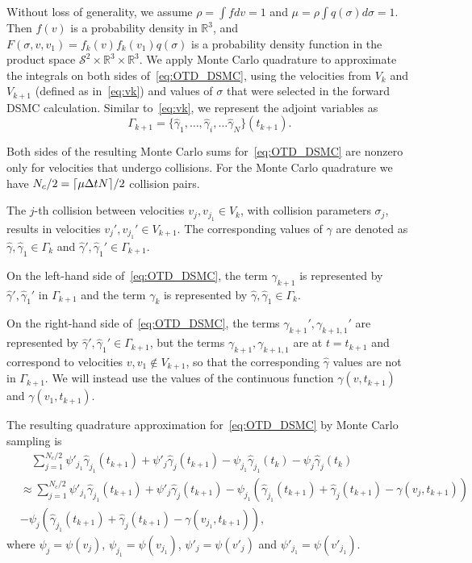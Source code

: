 \documentclass[times,final,nopreprintline]{elsarticle}
\DeclarePairedDelimiter{\ceil}{\lceil}{\rceil}
\newcommand{\bbR}{\mathbb R} \newcommand{\bbS}{\mathbb S}
\newcommand{\cS}{\mathcal S} \newcommand{\cT}{\mathcal T}
\newcommand{\Rthree}{{\bbR^3}}
\newcommand{\Stwo}{{\cS^2}}
\begin{document}
Without loss of generality, we assume $\rho = \int  f dv = 1$ and 
$\mu = \rho \int q(\sigma) d\sigma = 1$. Then $f(v)$ is a probability density in $\Rthree$, and $F(\sigma,v,v_1) =  f_k(v) f_k(v_1)q(\sigma)$ is a probability density function in the product space $\Stwo \times \Rthree \times \Rthree$. We apply Monte Carlo quadrature to approximate the integrals on both sides of~\eqref{eq:OTD_DSMC}, using the  velocities from  $V_{k}$ and $V_{k+1}$ (defined as in~\eqref{eq:vk}) and values of $\sigma$ that were selected in the forward DSMC calculation. Similar to~\eqref{eq:vk}, we represent the adjoint variables as
\begin{equation*} %
\Gamma_{k+1} =\{\hat \gamma_1, \ldots , \hat \gamma_i,\ldots \hat \gamma_N\} (t_{k+1}).
\end{equation*}

Both sides of the resulting Monte Carlo sums for~\eqref{eq:OTD_DSMC} are  nonzero only for velocities that undergo collisions. For the  Monte Carlo quadrature we have  $N_c/2 =  \ceil[]{ \mu\Delta t  N}/2$ collision pairs. 

The $j$-th collision between velocities $v_{j},v_{j_1} \in V_k$, with collision parameters $\sigma_{j}$,   results in velocities $v_{j}',v_{j_1}' \in V_{k+1}$. The corresponding values of $\gamma$ are denoted as $\hat \gamma, \hat \gamma_1 \in \Gamma_k$  and $\hat \gamma', \hat \gamma_1' \in \Gamma_{k+1}$. 

On the left-hand side of~\eqref{eq:OTD_DSMC}, the term $\gamma_{k+1}$ is represented by $\hat \gamma', \hat \gamma_1'$ in $\Gamma_{k+1}$ and the term $\gamma_{k}$ is represented by $\hat \gamma, \hat \gamma_1 \in \Gamma_k$. 

On the right-hand side of~\eqref{eq:OTD_DSMC}, the terms $\gamma_{k+1}',\gamma_{k+1,1}'$ are represented by $\hat \gamma', \hat \gamma_1' \in\Gamma_{k+1}$, but  the terms $\gamma_{k+1},\gamma_{k+1,1}$ are at $t=t_{k+1}$ and correspond to velocities $v, v_1 \notin V_{k+1}$, so that the corresponding $\hat \gamma$ values are not in  $ \Gamma_{k+1}$. We will instead use the values of the continuous function $\gamma(v,t_{k+1})$ and $\gamma(v_1,t_{k+1})$. 



The resulting quadrature approximation for~\eqref{eq:OTD_DSMC} by Monte Carlo sampling is
\begin{align} \label{eq:OTD_DSMC2}
&\quad \sum_{j=1}^{ N_c/2} \psi'_{j_1} \hat \gamma_{j_1}(t_{k+1}) + \psi'_{j} \hat \gamma_{j}(t_{k+1}) - \psi_{j_1} \hat \gamma_{j_1}(t_{k})  -  \psi_{j} \hat \gamma_{j}(t_{k}) \\ 
&\approx \sum_{j=1}^{ N_c/2}  \psi'_{j_1} \hat \gamma_{j_1}(t_{k+1}) +  \psi'_{j}  \hat \gamma_{j}(t_{k+1})  -  \psi_{j_1} \left( \hat \gamma_{j_1}(t_{k+1})+ \hat \gamma_{j}(t_{k+1}) - \gamma(v_j, t_{k+1})\right) \nonumber\\
& - \psi_j \left( \hat \gamma_{j_1}(t_{k+1}) + \hat \gamma_{j}(t_{k+1}) - \gamma(v_{j_1} , t_{k+1}) \right), \nonumber
\end{align}
where $\psi_j = \psi(v_j)$, $\psi_{j_1} = \psi(v_{j_1})$, $\psi'_j = \psi(v'_j)$ and $\psi'_{j_1} = \psi(v'_{j_1})$. 
\end{document}
